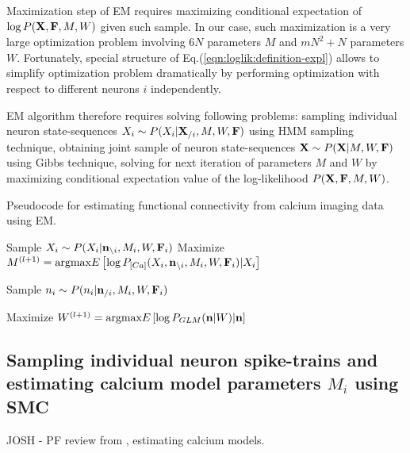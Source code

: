 Maximization step of EM requires maximizing conditional expectation of $\log P({\bf X}, {\bf F}, M, W)$ given such sample. In our case, such maximization is a very large optimization problem involving $6N$ parameters $M$ and $mN^2+N$ parameters $W$. Fortunately, special structure of Eq.(\ref{eqn:loglik:definition-expl}) allows to simplify optimization problem dramatically by performing optimization with respect to different neurons $i$ independently.

EM algorithm therefore requires solving following problems: sampling individual neuron state-sequences $X_i\sim P(X_{i}|{\bf X}_{/i}, M, W, {\bf F})$ using HMM sampling technique, obtaining joint sample of neuron state-sequences ${\bf X}\sim P({\bf X}|M, W, {\bf F})$ using Gibbs technique, solving for next iteration of parameters $M$ and $W$ by maximizing conditional expectation value of the log-likelihood $P({\bf X}, {\bf F}, M, W)$.

\begin{algorithm}
\caption{Pseudocode for estimating functional connectivity from calcium imaging data using EM.}\label{eqn:pseudocode}
\begin{algorithmic}
      \State Sample $X_i \sim P(X_i|{\bf n}_{\backslash i}, M_i, W, {\bf F}_i)$
      \State Maximize $M^{(l+1)}=\text{argmax} E\left[\log P_{[Ca]}(X_i, {\bf n}_{\backslash i}, M_i, W, {\bf F}_i)|X_i\right]$
    \EndWhile
  \EndFor
  
      \State Sample $n_i \sim P(n_i|{\bf n}_{/i}, M_i, W, {\bf F}_i)$
    \EndFor
  \EndFor 

  \State Maximize $W^{(l+1)}=\text{argmax} E\left[\log P_{GLM}({\bf n}|W)|{\bf n}\right]$  
\EndWhile
\end{algorithmic}
\end{algorithm}

\subsection{\label{sec:methods:sampling_neuron}Sampling individual neuron spike-trains and estimating calcium model parameters $M_i$ using SMC}
JOSH - PF review from \cite{Vogelstein2009}, estimating calcium models.
